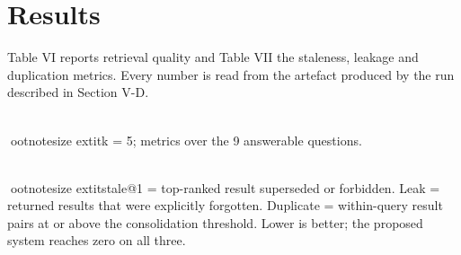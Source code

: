 \documentclass[conference]{IEEEtran}
\begin{document}
\section{Results}
Table VI reports retrieval quality and Table VII the staleness, leakage and duplication metrics. Every number is read from the artefact produced by the run described in Section V-D.
\begin{table}[!t]
\caption{Retrieval Quality Across Four Pipelines}
\label{tab:vi}
\centering
{}
\\[2pt]ootnotesize	extit{k = 5; metrics over the 9 answerable questions.}
\end{table}

\begin{table}[!t]
\caption{Staleness, Leakage and Duplication}
\label{tab:vii}
\centering
{}
\\[2pt]ootnotesize	extit{stale@1 = top-ranked result superseded or forbidden. Leak = returned results that were explicitly forgotten. Duplicate = within-query result pairs at or above the consolidation threshold. Lower is better; the proposed system reaches zero on all three.}
\end{table}
\end{document}
